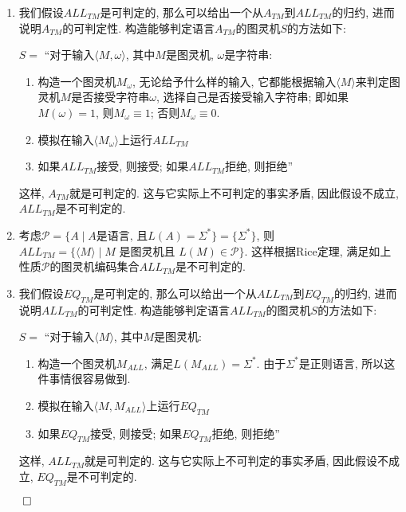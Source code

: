 \documentclass[UTF8]{report}
\renewenvironment{proof}{{\setlength{\parskip}{7pt}\noindent\hskip 2em \bf 证明 \quad}}{\hfill$\qed$\par}
\begin{document}
\begin{proof}
    \begin{enumerate}[label={(\alph*)}]
        \item 我们假设$ALL_{TM}$是可判定的, 那么可以给出一个从$A_{TM}$到$ALL_{TM}$的归约, 进而说明$A_{TM}$的可判定性. 构造能够判定语言$A_{TM}$的图灵机$S$的方法如下:

        $S =$ ``对于输入$\langle M, \omega \rangle$, 其中$M$是图灵机, $\omega$是字符串:
        \begin{enumerate}
            \item 构造一个图灵机$M_{\omega}$, 无论给予什么样的输入, 它都能根据输入$\langle M \rangle$来判定图灵机$M$是否接受字符串$\omega$, 选择自己是否接受输入字符串; 即如果$M(\omega) = 1$, 则$M_{\omega} \equiv 1$; 否则$M_{\omega} \equiv 0$.
            \item 模拟在输入$\langle M_{\omega} \rangle$上运行$ALL_{TM}$
            \item 如果$ALL_{TM}$接受, 则接受; 如果$ALL_{TM}$拒绝, 则拒绝''
        \end{enumerate}
    
        这样, $A_{TM}$就是可判定的. 这与它实际上不可判定的事实矛盾, 因此假设不成立, $ALL_{TM}$是不可判定的.
        
        \item 考虑$\mathcal{P} = \{A \mid A\text{是语言, 且} L(A) = \Sigma^* \} = \{\Sigma^* \}$, 则$ALL_{TM}= \{ \langle M \rangle \mid M \text{ 是图灵机且 } L(M) \in\mathcal{P} \}$. 这样根据Rice定理, 满足如上性质$\mathcal{P}$的图灵机编码集合$ALL_{TM}$是不可判定的.
        
        \item 我们假设$EQ_{TM}$是可判定的, 那么可以给出一个从$ALL_{TM}$到$EQ_{TM}$的归约, 进而说明$ALL_{TM}$的可判定性. 构造能够判定语言$ALL_{TM}$的图灵机$S$的方法如下:

        $S =$ ``对于输入$\langle M \rangle$, 其中$M$是图灵机:
        \begin{enumerate}
            \item 构造一个图灵机$M_{ALL}$, 满足$L(M_{ALL}) = \Sigma^*$. 由于$\Sigma^*$是正则语言, 所以这件事情很容易做到.
            \item 模拟在输入$\langle M, M_{ALL} \rangle$上运行$EQ_{TM}$
            \item 如果$EQ_{TM}$接受, 则接受; 如果$EQ_{TM}$拒绝, 则拒绝''
        \end{enumerate}
    
        这样, $ALL_{TM}$就是可判定的. 这与它实际上不可判定的事实矛盾, 因此假设不成立, $EQ_{TM}$是不可判定的.
    \end{enumerate}
\end{proof}
\end{document}

